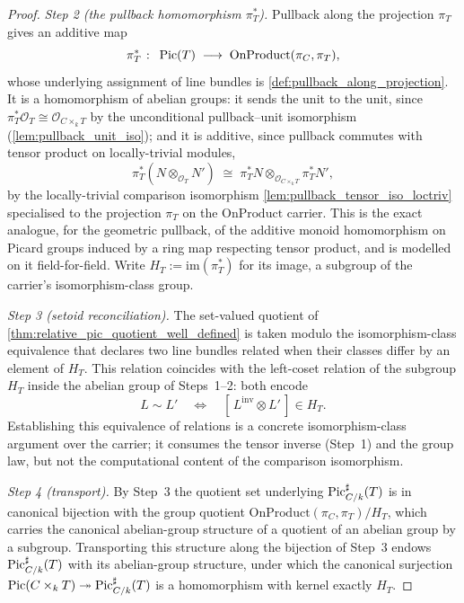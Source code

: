 \begin{proof}
  \emph{Step 2 (the pullback homomorphism \(\pi_T^*\)).} Pullback along the
  projection \(\pi_T\) gives an additive map
  \[
    \pi_T^* \;\colon\; \operatorname{Pic}(T) \;\longrightarrow\; \mathrm{OnProduct}(\pi_C, \pi_T),
  \]
  whose underlying assignment of line bundles is
  \cref{def:pullback_along_projection}. It is a homomorphism of abelian groups:
  it sends the unit to the unit, since
  \(\pi_T^*\mathcal{O}_T \cong \mathcal{O}_{C \times_k T}\) by the unconditional
  pullback--unit isomorphism (\cref{lem:pullback_unit_iso}); and it is additive,
  since pullback commutes with tensor product on locally-trivial modules,
  \[
    \pi_T^*(N \otimes_{\mathcal{O}_T} N') \;\cong\;
      \pi_T^* N \otimes_{\mathcal{O}_{C \times_k T}} \pi_T^* N',
  \]
  by the locally-trivial comparison isomorphism
  \cref{lem:pullback_tensor_iso_loctriv} specialised to the projection
  \(\pi_T\) on the \(\mathrm{OnProduct}\) carrier. This is the exact analogue,
  for the geometric pullback, of the additive monoid homomorphism on Picard
  groups induced by a ring map respecting tensor product, and is modelled on it
  field-for-field. Write \(H_T := \mathrm{im}(\pi_T^*)\) for its image, a
  subgroup of the carrier's isomorphism-class group.

  \emph{Step 3 (setoid reconciliation).} The set-valued quotient of
  \cref{thm:relative_pic_quotient_well_defined} is taken modulo the
  isomorphism-class equivalence that declares two line bundles related when
  their classes differ by an element of \(H_T\). This relation coincides with
  the left-coset relation of the subgroup \(H_T\) inside the abelian group of
  Steps~1--2: both encode
  \[
    L \sim L' \quad\Longleftrightarrow\quad
      [\, L^{\mathrm{inv}} \otimes L' \,] \in H_T .
  \]
  Establishing this equivalence of relations is a concrete isomorphism-class
  argument over the carrier; it consumes the tensor inverse (Step~1) and the
  group law, but not the computational content of the comparison isomorphism.

  \emph{Step 4 (transport).} By Step~3 the quotient set underlying
  \(\operatorname{Pic}^\sharp_{C/k}(T)\) is in canonical bijection with the group quotient
  \(\mathrm{OnProduct}(\pi_C, \pi_T) / H_T\), which carries the canonical
  abelian-group structure of a quotient of an abelian group by a subgroup.
  Transporting this structure along the bijection of Step~3 endows
  \(\operatorname{Pic}^\sharp_{C/k}(T)\) with its abelian-group structure, under which the
  canonical surjection
  \(\operatorname{Pic}(C \times_k T) \twoheadrightarrow \operatorname{Pic}^\sharp_{C/k}(T)\) is a
  homomorphism with kernel exactly \(H_T\).
\end{proof}

